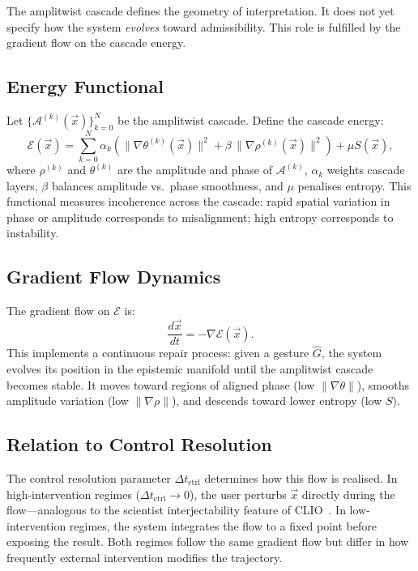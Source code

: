 \documentclass[11pt, a4paper]{article}
\begin{document}
The amplitwist cascade defines the geometry of interpretation. It does
not yet specify how the system \emph{evolves} toward admissibility. This
role is fulfilled by the gradient flow on the cascade energy.

\subsection{Energy Functional}

Let $\{\mathcal{A}^{(k)}(\vec{x})\}_{k=0}^N$ be the amplitwist cascade.
Define the cascade energy:
\[
  \mathcal{E}(\vec{x}) =
  \sum_{k=0}^N \alpha_k \left(
    \|\nabla\theta^{(k)}(\vec{x})\|^2 +
    \beta\,\|\nabla\rho^{(k)}(\vec{x})\|^2
  \right) + \mu S(\vec{x}),
\]
where $\rho^{(k)}$ and $\theta^{(k)}$ are the amplitude and phase of
$\mathcal{A}^{(k)}$, $\alpha_k$ weights cascade layers, $\beta$ balances
amplitude vs.\ phase smoothness, and $\mu$ penalises entropy. This
functional measures incoherence across the cascade: rapid spatial
variation in phase or amplitude corresponds to misalignment; high entropy
corresponds to instability.

\subsection{Gradient Flow Dynamics}

The gradient flow on $\mathcal{E}$ is:
\[
  \frac{d\vec{x}}{dt} = -\nabla\mathcal{E}(\vec{x}).
\]
This implements a continuous repair process: given a gesture $\hat{G}$,
the system evolves its position in the epistemic manifold until the
amplitwist cascade becomes stable. It moves toward regions of aligned
phase (low $\|\nabla\theta\|$), smooths amplitude variation (low
$\|\nabla\rho\|$), and descends toward lower entropy (low $S$).

\subsection{Relation to Control Resolution}

The control resolution parameter $\Delta t_{\mathrm{ctrl}}$ determines
how this flow is realised. In high-intervention regimes
($\Delta t_{\mathrm{ctrl}} \to 0$), the user perturbs $\vec{x}$ directly
during the flow---analogous to the scientist interjectability feature of
CLIO~\cite{cheng2025clio}. In low-intervention regimes, the system integrates the
flow to a fixed point before exposing the result. Both regimes follow the
same gradient flow but differ in how frequently external intervention
modifies the trajectory.
\end{document}
